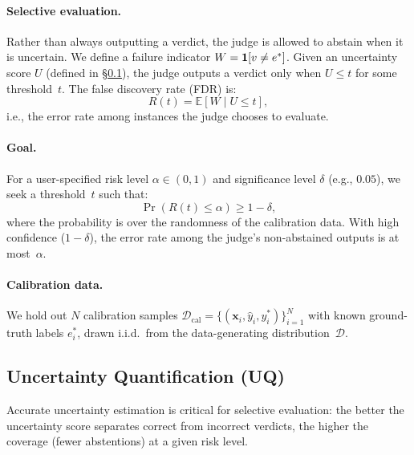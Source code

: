 \paragraph{Selective evaluation.}
Rather than always outputting a verdict, the judge is allowed to abstain when it is uncertain. We define a failure indicator $W = \mathbf{1}[v \neq e^*]$. Given an uncertainty score $U$ (defined in \S\ref{sec:uncertainty}), the judge outputs a verdict only when $U \leq t$ for some threshold~$t$. The false discovery rate (FDR) is:
\begin{equation}
\label{eq:fdr}
  R(t) = \mathbb{E}\!\left[W \mid U \leq t\right],
\end{equation}
i.e., the error rate among instances the judge chooses to evaluate.

\paragraph{Goal.}
For a user-specified risk level $\alpha \in (0,1)$ and significance level $\delta$ (e.g., $0.05$), we seek a threshold~$t$ such that:
\begin{equation}
\label{eq:goal}
  \Pr\!\left(R(t) \leq \alpha\right) \geq 1 - \delta,
\end{equation}
where the probability is over the randomness of the calibration data. With high confidence ($1\!-\!\delta$), the error rate among the judge's non-abstained outputs is at most~$\alpha$.

\paragraph{Calibration data.}
We hold out $N$ calibration samples $\mathcal{D}_{\mathrm{cal}} = \{(\mathbf{x}_i, \hat{y}_i, y^*_i)\}_{i=1}^{N}$ with known ground-truth labels $e_i^*$, drawn i.i.d.\ from the data-generating distribution~$\mathcal{D}$.

\subsection{Uncertainty Quantification (UQ)}
\label{sec:uncertainty}

Accurate uncertainty estimation is critical for selective evaluation: the better the uncertainty score separates correct from incorrect verdicts, the higher the coverage (fewer abstentions) at a given risk level. %

